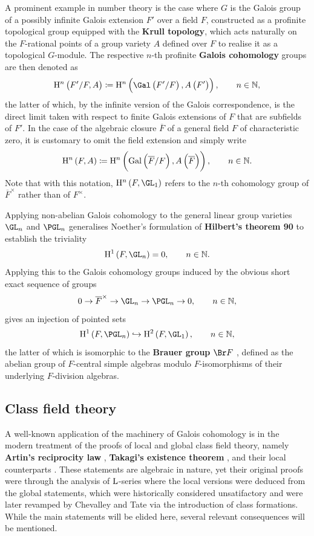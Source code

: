 A prominent example in number theory is the case where $ G $ is the Galois group of a possibly infinite Galois extension $ F' $ over a field $ F $, constructed as a profinite topological group equipped with the \textbf{Krull topology}, which acts naturally on the $ F $-rational points of a group variety $ A $ defined over $ F $ to realise it as a topological $ G $-module. The respective $ n $-th profinite \textbf{Galois cohomology} groups are then denoted as
$$ \H^n\br{F' / F, A} \coloneqq \H^n\br{\Gal\br{F' / F}, A\br{F'}}, \qquad n \in \NN, $$
the latter of which, by the infinite version of the Galois correspondence, is the direct limit taken with respect to finite Galois extensions of $ F $ that are subfields of $ F' $. In the case of the algebraic closure $ \overline{F} $ of a general field $ F $ of characteristic zero, it is customary to omit the field extension and simply write
$$ \H^n\br{F, A} \coloneqq \H^n\br{\AG{F}, A\br{\overline{F}}}, \qquad n \in \NN. $$
Note that with this notation, $ \H^n\br{F, \GL_1} $ refers to the $ n $-th cohomology group of $ \overline{F}^\times $ rather than of $ F^\times $.

Applying non-abelian Galois cohomology to the general linear group varieties $ \GL_n $ and $ \PGL_n $ generalises Noether's formulation of \textbf{Hilbert's theorem 90} \cite[Proposition X.3]{Ser80} to establish the triviality
$$ \H^1\br{F, \GL_n} = 0, \qquad n \in \NN. $$
Applying this to the Galois cohomology groups induced by the obvious short exact sequence of groups
$$ 0 \to \overline{F}^\times \to \GL_n \to \PGL_n \to 0, \qquad n \in \NN, $$
gives an injection of pointed sets \cite[Proposition X.8]{Ser80}
$$ \H^1\br{F, \PGL_n} \hookrightarrow \H^2\br{F, \GL_1}, \qquad n \in \NN, $$
the latter of which is isomorphic to the \textbf{Brauer group} $ \Br F $ \cite[Proposition X.9]{Ser80}, defined as the abelian group of $ F $-central simple algebras modulo $ F $-isomorphisms of their underlying $ F $-division algebras.

\pagebreak

\subsection{Class field theory}

A well-known application of the machinery of Galois cohomology is in the modern treatment of the proofs of local and global class field theory, namely \textbf{Artin's reciprocity law} \cite[Theorems V.3.5 and V.5.3]{Mil13}, \textbf{Takagi's existence theorem} \cite[Theorems V.3.6 and V.5.5]{Mil13}, and their local counterparts \cite[Theorems I.1.1 and I.1.4]{Mil13}. These statements are algebraic in nature, yet their original proofs were through the analysis of $ \mathrm{L} $-series where the local versions were deduced from the global statements, which were historically considered unsatifactory and were later revamped by Chevalley and Tate via the introduction of class formations. While the main statements will be elided here, several relevant consequences will be mentioned.

